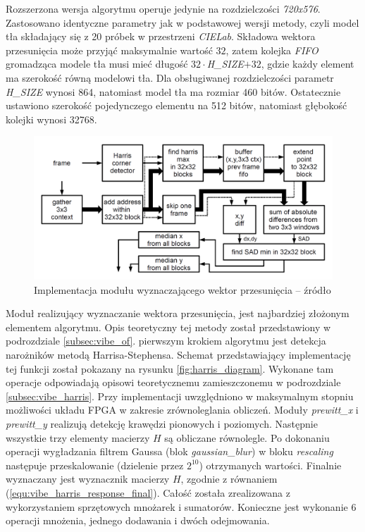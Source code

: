 Rozszerzona wersja algorytmu operuje jedynie na rozdzielczości \textit{720x576}. Zastosowano identyczne parametry jak w podstawowej wersji metody, czyli model tła składający się z 20 próbek w przestrzeni \textit{CIELab}. Składowa wektora przesunięcia może przyjąć maksymalnie wartość $32$, zatem kolejka \textit{FIFO} gromadząca modele tła musi mieć długość $32 \cdot$\textit{H\_SIZE}$+32$, gdzie każdy element ma szerokość równą modelowi tła. Dla obsługiwanej rozdzielczości parametr \textit{H\_SIZE} wynosi 864, natomiast model tła ma rozmiar 460 bitów. Ostatecznie ustawiono szerokość pojedynczego elementu na 512 bitów, natomiast głębokość kolejki wynosi 32768.  

	\begin{figure}[h!]
		\centering
		\includegraphics[scale=0.25]{img/4/displacement_vector_diagram.png}
		\caption{Implementacja modułu wyznaczającego wektor przesunięcia -- źródło \cite{}}
		\label{fig:displacement_diagram}
	\end{figure}

Moduł realizujący wyznaczanie wektora przesunięcia, jest najbardziej złożonym elementem algorytmu. Opis teoretyczny tej metody został przedstawiony w podrozdziale \ref{subsec:vibe_of}. pierwszym krokiem algorytmu jest detekcja narożników metodą Harrisa-Stephensa. Schemat przedstawiający implementację tej funkcji został pokazany na rysunku \ref{fig:harris_diagram}. Wykonane tam operacje odpowiadają opisowi teoretycznemu zamieszczonemu w podrozdziale \ref{subsec:vibe_harris}. Przy implementacji uwzględniono w maksymalnym stopniu możliwości układu FPGA w zakresie zrównoleglania obliczeń. Moduły \textit{prewitt\_x} i \textit{prewitt\_y} realizują detekcję krawędzi pionowych i poziomych. Następnie wszystkie trzy elementy macierzy $H$ są obliczane równolegle. Po dokonaniu operacji wygładzania filtrem Gaussa (blok \textit{gaussian\_blur}) w bloku \textit{rescaling} następuje przeskalowanie (dzielenie przez $2^10$) otrzymanych wartości. Finalnie wyznaczany jest wyznacznik macierzy $H$, zgodnie z równaniem (\ref{equ:vibe_harris_response_final}). Całość została zrealizowana z wykorzystaniem sprzętowych mnożarek i sumatorów. Konieczne jest wykonanie 6 operacji mnożenia, jednego dodawania i dwóch odejmowania.
 
